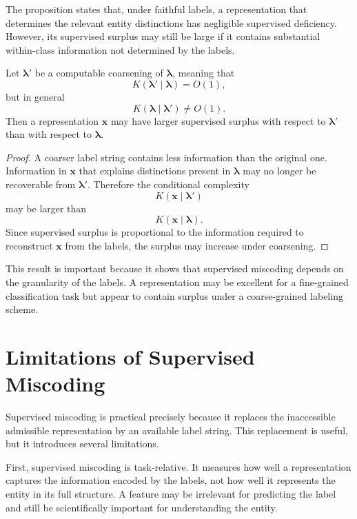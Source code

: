 The proposition states that, under faithful labels, a representation that determines the relevant entity distinctions has negligible supervised deficiency. However, its supervised surplus may still be large if it contains substantial within-class information not determined by the labels.

\begin{proposition}
\label{prop:label_coarsening_increases_surplus}
Let \(\boldsymbol{\lambda}'\) be a computable coarsening of \(\boldsymbol{\lambda}\), meaning that
\[
    K(\boldsymbol{\lambda}'\mid \boldsymbol{\lambda})=O(1),
\]
but in general
\[
    K(\boldsymbol{\lambda}\mid \boldsymbol{\lambda}')\not=O(1).
\]
Then a representation \(\mathbf{x}\) may have larger supervised surplus with respect to \(\boldsymbol{\lambda}'\) than with respect to \(\boldsymbol{\lambda}\).
\end{proposition}

\begin{proof}
A coarser label string contains less information than the original one. Information in \(\mathbf{x}\) that explains distinctions present in \(\boldsymbol{\lambda}\) may no longer be recoverable from \(\boldsymbol{\lambda}'\). Therefore the conditional complexity
\[
    K(\mathbf{x}\mid \boldsymbol{\lambda}')
\]
may be larger than
\[
    K(\mathbf{x}\mid \boldsymbol{\lambda}).
\]
Since supervised surplus is proportional to the information required to reconstruct \(\mathbf{x}\) from the labels, the surplus may increase under coarsening.
\end{proof}

This result is important because it shows that supervised miscoding depends on the granularity of the labels. A representation may be excellent for a fine-grained classification task but appear to contain surplus under a coarse-grained labeling scheme.

\section{Limitations of Supervised Miscoding}
\label{sec:limitations_supervised_miscoding}

Supervised miscoding is practical precisely because it replaces the inaccessible admissible representation by an available label string. This replacement is useful, but it introduces several limitations.

First, supervised miscoding is task-relative. It measures how well a representation captures the information encoded by the labels, not how well it represents the entity in its full structure. A feature may be irrelevant for predicting the label and still be scientifically important for understanding the entity.

